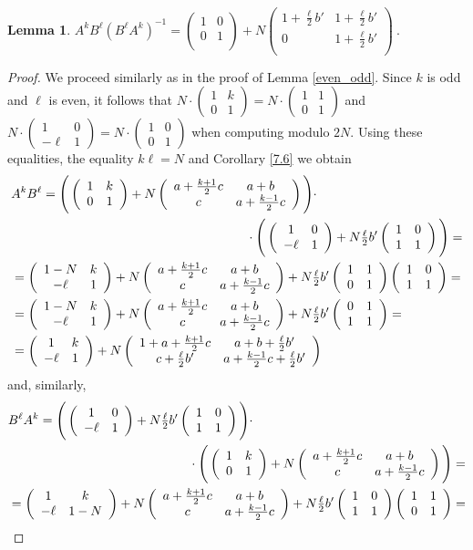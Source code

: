 \documentclass[10pt]{amsart}
\theoremstyle{plain}
\newtheorem{lemma}[theorem]{Lemma}
\theoremstyle{definition}
\theoremstyle{remark}%
\newcommand{\mat}[4]{\left(\begin{array}{cc}
 #1 & #2\\
 #3 & #4\\
\end{array}\right)}
\begin{document}
\begin{lemma}\label{odd_even}
 $A^k B^\ell(B^\ell A^k)^{-1}=\mat{1}{0}{0}{1}+N\mat{1+\frac{\ell}{2}b'}{1+\frac{\ell}{2}b'}{0}{1+\frac{\ell}{2}b'}\ .$
\end{lemma}
\begin{proof}
We proceed similarly as in the proof of Lemma \ref{even_odd}. Since $k$ is odd and $\ell$ is even, it follows that $N\cdot(\begin{smallmatrix}1 & k\\ 0 & 1\end{smallmatrix})=N\cdot(\begin{smallmatrix}1 & 1\\ 0 & 1\end{smallmatrix})$ and $N\cdot(\begin{smallmatrix}1 & 0\\ -\ell & 1\end{smallmatrix})=N\cdot(\begin{smallmatrix}1 & 0\\ 0 & 1\end{smallmatrix})$ when computing modulo $2N$. Using these equalities, the equality $k\ell=N$ and Corollary \ref{7.6} we obtain
\begin{align*}
 &A^k B^\ell=\Bigg(\mat{1}{k}{0}{1}+
 N\mat{a+\frac{k+1}{2}c}{a+b}{c}{a+\frac{k-1}{2}c}\Bigg)\cdot\\
 &\hspace{65mm}\cdot\Bigg(\mat{1}{0}{-\ell}{1}+
 N\tfrac{\ell}{2}b'\mat{1}{0}{1}{1}\Bigg)=\\
 &=\mat{1-N}{k}{-\ell}{1}+
N\mat{a+\frac{k+1}{2}c}{a+b}{c}{a+\frac{k-1}{2}c}+
N\tfrac{\ell}{2}b'\mat{1}{1}{0}{1}\mat{1}{0}{1}{1}=\\
&=\mat{1-N}{k}{-\ell}{1}+
N\mat{a+\frac{k+1}{2}c}{a+b}{c}{a+\frac{k-1}{2}c}+
N\tfrac{\ell}{2}b'\mat{0}{1}{1}{1}=\\
&=\mat{1}{k}{-\ell}{1}+
N\mat{1+a+\frac{k+1}{2}c}{a+b+\frac{\ell}{2}b'}{c+\frac{\ell}{2}b'}{a+\frac{k-1}{2}c+\frac{\ell}{2}b'}
\end{align*}
and, similarly,
\begin{align*}
 &B^\ell A^k=\Bigg(\mat{1}{0}{-\ell}{1}+
 N\tfrac{\ell}{2}b'\mat{1}{0}{1}{1}\Bigg)\cdot\\
 &\hspace{50mm}\cdot\Bigg(\mat{1}{k}{0}{1}+
 N\mat{a+\frac{k+1}{2}c}{a+b}{c}{a+\frac{k-1}{2}c}\Bigg)=\\
 &=\mat{1}{k}{-\ell}{1-N}+
 N\mat{a+\frac{k+1}{2}c}{a+b}{c}{a+\frac{k-1}{2}c}+N\tfrac{\ell}{2}b'\mat{1}{0}{1}{1}\mat{1}{1}{0}{1}=\\

\end{align*}
\end{proof}
\end{document}
